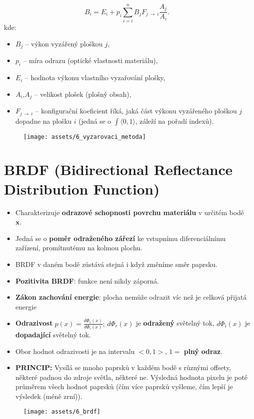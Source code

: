 \begin{equation*}
    B_i = E_i + p_i \sum\limits_{i=i}^n B_j F_{j \,\to\, i} \frac{A_j}{A_i}.
\end{equation*}
kde:
\begin{itemize}
    \item $B_j$ -- výkon vyzářený ploškou $j$,
    \item $p_i$ -- míra odrazu (optické vlastnosti materiálu),
    \item $E_i$ -- hodnota výkonu vlastního vyzařování plošky,
    \item $A_i$,$A_j$ -- velikost plošek (plošný obsah),
    \item $F_{j \,\to\, i}$ -- konfigurační koeficient říká, jaká část výkonu vyzářeného ploškou $j$ dopadne na plošku $i$ (jedná se o $\int \langle0,1\rangle$, záleží na pořadí indexů).
\end{itemize}
\begin{figure}[H]
    \centering
    \texttt{[image: assets/6\_vyzarovaci\_metoda]}
\end{figure}

\section{BRDF (Bidirectional Reflectance Distribution Function)}
\begin{itemize}
    \item Charakterizuje \textbf{odrazové schopnosti povrchu materiálu} v určitém bodě $\mathbf{x}$.
    \item Jedná se o \textbf{poměr odraženého zářezí} ke vstupnímu diferenciálnímu zařízení, promítnutému na kolmou plochu.
    \item BRDF v daném bodě zůstává stejná i když změníme směr paprsku.
    \item \textbf{Pozitivita BRDF}: funkce není nikdy záporná.
    \item \textbf{Zákon zachování energie}: plocha nemůže odrazit víc než je celková přijatá energie
    \item \textbf{Odrazivost} $p(x) = \frac{d\Phi_r(x)}{d\Phi_i(x)}; \, d\Phi_r(x)$ je \textbf{odražený} světelný tok, $d\Phi_i(x)$ je \textbf{dopadající} světelný tok.
    \item Obor hodnot odrazivosti je na intervalu $<0,1>, \, 1=$ \textbf{plný odraz}.
    \item \textbf{PRINCIP:} Vysílá se mnoho paprsků v každém bodě s různými offsety, některé padnou do zdroje světla, některé ne. Výsledná hodnota pixelu je poté průměrem všech hodnot paprsků (čím více paprsků vyšleme, čím lepší je výsledek (méně zrní)).
\end{itemize}
\begin{figure}[H]
    \centering
    \texttt{[image: assets/6\_brdf]}
\end{figure}
